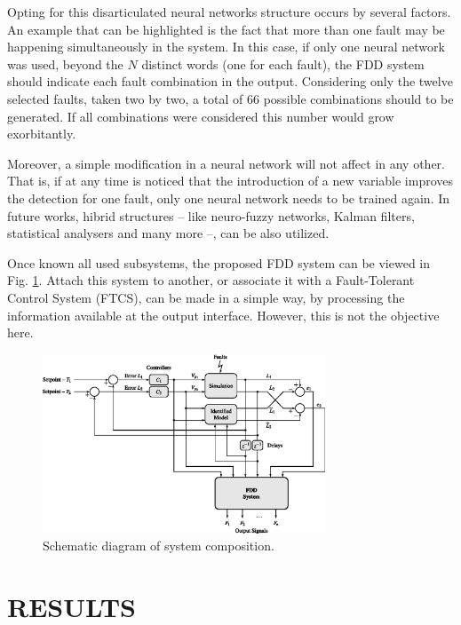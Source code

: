 \documentclass[10pt,fleqn,a4paper]{article}
\begin{document}
Opting for this disarticulated neural networks structure occurs by several
factors. An example that can be highlighted is the fact that more than one fault
may be happening simultaneously in the system. In this case, if only one neural
network was used, beyond the $N$ distinct words (one for each fault), the FDD
system should indicate each fault combination in the output. Considering only
the twelve selected faults, taken two by two, a total of 66 possible
combinations should to be generated. If all combinations were considered this
number would grow exorbitantly.

Moreover, a simple modification in a neural network will not affect in any
other. That is, if at any time is noticed that the introduction of a new
variable improves the detection for one fault, only one neural network needs to
be trained again. In future works, hibrid structures -- like neuro-fuzzy
networks, Kalman filters, statistical analysers and many more --, can be also
utilized.

Once known all used subsystems, the proposed FDD system can be viewed in Fig.
\ref{fig:comp}. Attach this system to another, or associate it with a
Fault-Tolerant Control System (FTCS), can be made in a simple way, by processing
the information available at the output interface. However, this is not the
objective here.

\begin{figure}[htb]
\centering
    \includegraphics[width=0.75\textwidth]{imgs/comp}
    \caption{Schematic diagram of system composition.}
    \label{fig:comp}
\end{figure}

\section{RESULTS}\label{sec:results}
\end{document}

